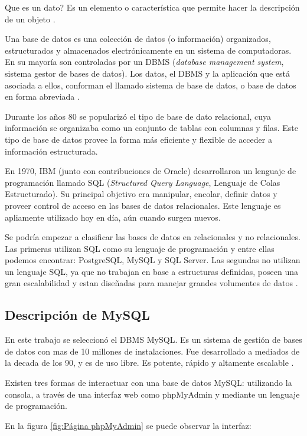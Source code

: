 Que es un dato? Es un elemento o característica que permite hacer la descripción de un objeto \citep{WEBSITE:12}.

Una base de datos es una colección de datos (o información) organizados, estructurados y almacenados electrónicamente en un sistema de computadoras. En su mayoría son controladas por un DBMS (\textit{database management system}, sistema gestor de bases de datos). Los datos, el DBMS y la aplicación que está asociada a ellos, conforman el llamado sistema de base de datos, o base de datos en forma abreviada \citep{WEBSITE:11}.

Durante los años 80 se popularizó el tipo de base de dato relacional, cuya información se organizaba como un conjunto de tablas con columnas y filas. Este tipo de base de datos provee la forma más eficiente y flexible de acceder a información estructurada.

En 1970, IBM (junto con contribuciones de Oracle) desarrollaron un lenguaje de programación llamado SQL (\textit{Structured Query Language}, Lenguaje de Colas Estructurado). Su principal objetivo era manipular, encolar, definir datos y proveer control de acceso en las bases de datos relacionales. Este lenguaje es apliamente utilizado hoy en día, aún cuando surgen nuevos.

Se podría empezar a clasificar las bases de datos en relacionales y no relacionales. Las primeras utilizan SQL como su lenguaje de programación y entre ellas podemos encontrar: PostgreSQL, MySQL y SQL Server. Las segundas no utilizan un lenguaje SQL, ya que no trabajan en base a estructuras definidas, poseen una gran escalabilidad y estan diseñadas para manejar grandes volumentes de datos \citep{WEBSITE:12}.


\subsection{Descripción de MySQL}
\label{subsec: Bases de datos relacionales}

En este trabajo se seleccionó el DBMS MySQL. Es un sistema de gestión de bases de datos con mas de 10 millones de instalaciones. Fue desarrollado a mediados de la decada de los 90, y es de uso libre. Es potente, rápido y altamente escalable \citep{BOOK:2}.

Existen tres formas de interactuar con una base de datos MySQL: utilizando la consola, a través de una interfaz web como phpMyAdmin y mediante un lenguaje de programación.

En la figura \ref{fig:Página phpMyAdmin} se puede observar la interfaz:
\pagebreak
 
